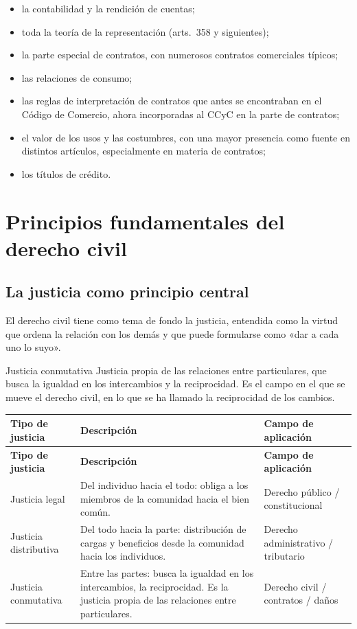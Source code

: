\documentclass[12pt,oneside]{book}
\begin{document}
\begin{itemize}
    \item la contabilidad y la rendición de cuentas;
    \item toda la teoría de la representación (arts.\ 358 y siguientes);
    \item la parte especial de contratos, con numerosos contratos comerciales típicos;
    \item las relaciones de consumo;
    \item las reglas de interpretación de contratos que antes se encontraban en el Código de Comercio, ahora incorporadas al CCyC en la parte de contratos;
    \item el valor de los usos y las costumbres, con una mayor presencia como fuente en distintos artículos, especialmente en materia de contratos;
    \item los títulos de crédito.
\end{itemize}

\section{Principios fundamentales del derecho civil}

\subsection{La justicia como principio central}

El derecho civil tiene como tema de fondo la justicia, entendida como la virtud que ordena la relación con los demás y que puede formularse como «dar a cada uno lo suyo».

\begin{definition}{Justicia conmutativa}
Justicia propia de las relaciones entre particulares, que busca la igualdad en los intercambios y la reciprocidad. Es el campo en el que se mueve el derecho civil, en lo que se ha llamado la reciprocidad de los cambios.
\end{definition}

\begin{longtable}{|p{}|p{}|p{}|}
\hline
\textbf{Tipo de justicia} & \textbf{Descripción} & \textbf{Campo de aplicación} \\
\hline
\endfirsthead
\hline
\textbf{Tipo de justicia} & \textbf{Descripción} & \textbf{Campo de aplicación} \\
\hline
\endhead
\hline
\endfoot
\hline
\endlastfoot
Justicia legal & Del individuo hacia el todo: obliga a los miembros de la comunidad hacia el bien común. & Derecho público / constitucional \\
\hline
Justicia distributiva & Del todo hacia la parte: distribución de cargas y beneficios desde la comunidad hacia los individuos. & Derecho administrativo / tributario \\
\hline
Justicia conmutativa & Entre las partes: busca la igualdad en los intercambios, la reciprocidad. Es la justicia propia de las relaciones entre particulares. & Derecho civil / contratos / daños \\
\hline
\end{longtable}
\end{document}
